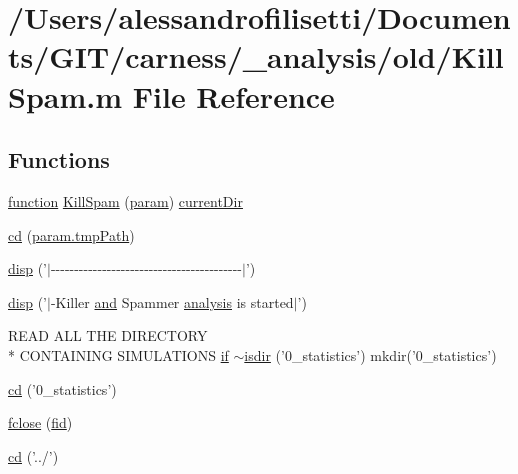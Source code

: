 \hypertarget{a00029}{\section{/\+Users/alessandrofilisetti/\+Documents/\+G\+I\+T/carness/\+\_\+analysis/old/\+Kill\+Spam.m File Reference}
\label{a00029}
}
\subsection*{Functions}
\begin{DoxyCompactItemize}
\item 
\hyperlink{a00110_a4b4c670b101bf7a838f775e008fa6255}{function} \hyperlink{a00029_acfbe15da69f5cf2e58667e2b19b500e7}{Kill\+Spam} (\hyperlink{a00033_a51f20d6b1b54a2eee3be0e8adc96a0ae}{param}) \hyperlink{a00031_af32eb97339f1e9d37b5540de2cbc79c9}{current\+Dir}
\item 
\hyperlink{a00029_a60547755325ad4e7a25c614f83776ee7}{cd} (\hyperlink{a00032_a1e5a4863ab2b87f923e1d19e2da1f5ac}{param.\+tmp\+Path})
\item 
\hyperlink{a00029_a3015506d09b4ef94312c10ce85f4c3ad}{disp} ('$\vert$-\/-\/-\/-\/-\/-\/-\/-\/-\/-\/-\/-\/-\/-\/-\/-\/-\/-\/-\/-\/-\/-\/-\/-\/-\/-\/-\/-\/-\/-\/-\/-\/-\/-\/-\/-\/-\/-\/-\/-\/-\/$\vert$')
\item 
\hyperlink{a00029_a16c8f16b559b22e1f31c9e00f75fe520}{disp} ('$\vert$-\/Killer \hyperlink{a00028_a170f8acb213f91bf71c77b1d20bceb33}{and} Spammer \hyperlink{a00032_abf6e5638a23a2531114655f3f690b70c}{analysis} is started$\vert$')
\item 
R\+E\+A\+D A\+L\+L T\+H\+E D\+I\+R\+E\+C\+T\+O\+R\+Y \\*
C\+O\+N\+T\+A\+I\+N\+I\+N\+G S\+I\+M\+U\+L\+A\+T\+I\+O\+N\+S \hyperlink{a00030_a01d55766b8058903dd360b4bda71f9f5}{if} \hyperlink{a00029_aef429e9a25e0d4d70aa2037a59816956}{$\sim$isdir} ('0\+\_\+statistics') mkdir('0\+\_\+statistics')
\item 
\hyperlink{a00029_a365d011aeb5adcedc5cc75e7df629a6f}{cd} ('0\+\_\+statistics')
\item 
\hyperlink{a00029_a5e769bbbabcaddc548203741c7100228}{fclose} (\hyperlink{a00031_ae9011d40c6f13e68e6f07156e0da7c5d}{fid})
\item 
\hyperlink{a00029_a7eb00a69197e8905221801683c7ec02a}{cd} ('../')
\item 

\end{DoxyCompactItemize}
